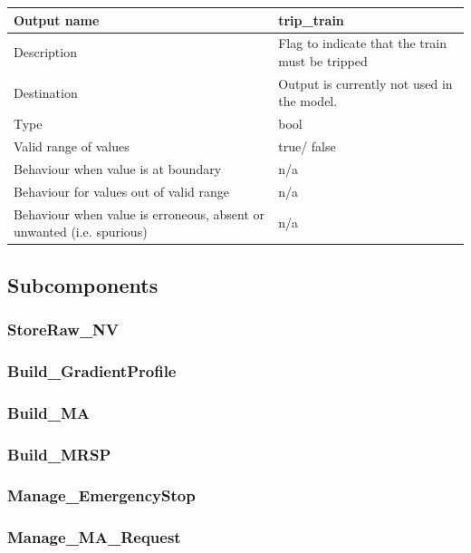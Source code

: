\begin{longtable}{p{}p{}}
\toprule
Output name				& trip\_train \\
\midrule
Description				& Flag to indicate that the train must be tripped \\
\midrule
Destination				& Output is currently not used in the model.\\ 
\midrule
Type					& bool\\
\midrule
Valid range of values	& true/ false \\
\midrule
Behaviour when value is at boundary	& n/a  \\
\midrule
Behaviour for values out of valid range	& n/a  \\
\midrule
Behaviour when value is erroneous, absent or unwanted (i.e. spurious) & n/a  \\
\bottomrule
\end{longtable}


\subsection{Subcomponents}\label{s:manage_track_data_subcomponents}

\subsubsection{StoreRaw\_NV}


\subsubsection{Build\_GradientProfile}


\subsubsection{Build\_MA}


\subsubsection{Build\_MRSP}


\subsubsection{Manage\_EmergencyStop}


\subsubsection{Manage\_MA\_Request}


\

